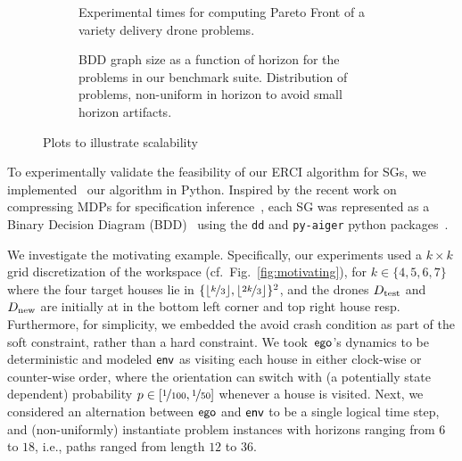 \begin{figure*}
    \begin{subfigure}{0.47\textwidth}
  \centering
  \scalebox{0.50}{
    
    }
    \caption{
      Experimental times for computing Pareto Front of a variety
      delivery drone problems\label{fig:exp_times}.
    }
  \end{subfigure}
  \hfill
    \begin{subfigure}{0.47\textwidth}
    \centering \scalebox{0.53}{
      
    }
    \caption{
      BDD graph size as a function of horizon for the problems in our
      benchmark suite. Distribution of problems, non-uniform in horizon
      to avoid small horizon artifacts\label{fig:bdd_sizes}.
    }
  \end{subfigure}
  \caption{Plots to illustrate scalability} 
\end{figure*}

 To experimentally validate the feasibility of our ERCI
algorithm for SGs, we implemented~\cite{RSS21code} our algorithm in
Python.  Inspired by the recent work on compressing MDPs for
specification inference~\cite{DBLP:conf/cav/Vazquez-Chanlatte20}, each
SG was represented as a Binary Decision Diagram
(BDD)~\cite{DBLP:journals/csur/Bryant92} using the \texttt{dd} and
\texttt{py-aiger} python packages~\cite{dd, pyAiger}.

We investigate the motivating example.
Specifically, our experiments used
a $k\times k$ grid discretization of the workspace (cf.\ Fig.~\ref{fig:motivating}), for $k \in
\{4,5,6,7\}$ where the four target houses lie in
$\{\lfloor\nicefrac{k}{3}\rfloor, \lfloor\nicefrac{2k}{3}\rfloor
\}^2$, and the drones ${D_{\text{test}}}$ and ${D_{\text{new}}}$ are initially at in the bottom left corner and top right house resp. Furthermore, for simplicity, we embedded the avoid crash
condition as part of the soft constraint, rather than a hard
constraint\footnotemark. We took~$\mathsf{ego}$'s dynamics to be deterministic
and modeled $\mathsf{env}$ as visiting each house in either clock-wise or
counter-wise order, where the orientation can switch with
(a potentially state dependent) probability $p \in [\nicefrac{1}{100},
\nicefrac{1}{50}]$ whenever a house is visited. Next, we considered an
alternation between $\mathsf{ego}$ and $\mathsf{env}$ to be a single logical time
step, and (non-uniformly) instantiate problem instances with horizons
ranging from $6$ to $18$, i.e., paths ranged from length $12$ to
$36$.


